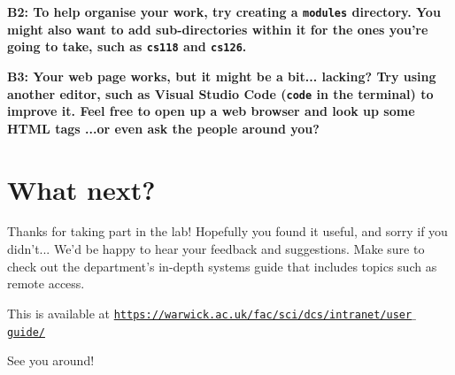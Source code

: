 \documentclass[a4paper,11pt,parskip=half-]{scrartcl}
\begin{document}
\bfseries B2: \normalfont 
To help organise your work, try creating a \texttt{modules} directory. 
You might also want to add sub-directories within it for the ones you're going to take, such as \texttt{cs118} and \texttt{cs126}.

\bfseries B3: \normalfont 
Your web page works, but it might be a bit... lacking? 
Try using another editor, such as Visual Studio Code (\texttt{code} in the terminal) to improve it. 
Feel free to open up a web browser and look up some HTML tags ...or even ask the people around you?

\section*{What next?}

Thanks for taking part in the lab! Hopefully you found it useful, and sorry if you didn't... 
We'd be happy to hear your feedback and suggestions.
Make sure to check out the department's in-depth systems guide that includes topics such as remote access.

This is available at \href{https://warwick.ac.uk/fac/sci/dcs/intranet/user_guide/}{\texttt{https://warwick.ac.uk/fac/sci/dcs/intranet/user$\_$guide/}}

See you around!
\end{document}
